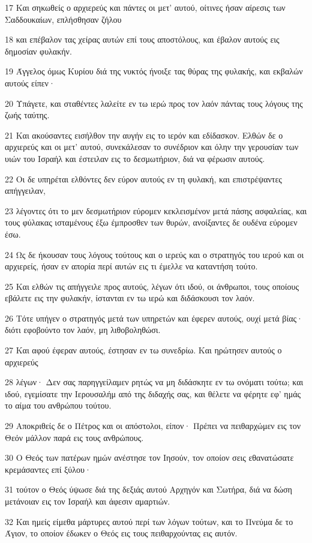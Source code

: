 \par 17 Και σηκωθείς ο αρχιερεύς και πάντες οι μετ' αυτού, οίτινες ήσαν αίρεσις των Σαδδουκαίων, επλήσθησαν ζήλου
\par 18 και επέβαλον τας χείρας αυτών επί τους αποστόλους, και έβαλον αυτούς εις δημοσίαν φυλακήν.
\par 19 Άγγελος όμως Κυρίου διά της νυκτός ήνοιξε τας θύρας της φυλακής, και εκβαλών αυτούς είπεν·
\par 20 Υπάγετε, και σταθέντες λαλείτε εν τω ιερώ προς τον λαόν πάντας τους λόγους της ζωής ταύτης.
\par 21 Και ακούσαντες εισήλθον την αυγήν εις το ιερόν και εδίδασκον. Ελθών δε ο αρχιερεύς και οι μετ' αυτού, συνεκάλεσαν το συνέδριον και όλην την γερουσίαν των υιών του Ισραήλ και έστειλαν εις το δεσμωτήριον, διά να φέρωσιν αυτούς.
\par 22 Οι δε υπηρέται ελθόντες δεν εύρον αυτούς εν τη φυλακή, και επιστρέψαντες απήγγειλαν,
\par 23 λέγοντες ότι το μεν δεσμωτήριον εύρομεν κεκλεισμένον μετά πάσης ασφαλείας, και τους φύλακας ισταμένους έξω έμπροσθεν των θυρών, ανοίξαντες δε ουδένα εύρομεν έσω.
\par 24 Ως δε ήκουσαν τους λόγους τούτους και ο ιερεύς και ο στρατηγός του ιερού και οι αρχιερείς, ήσαν εν απορία περί αυτών εις τι έμελλε να καταντήση τούτο.
\par 25 Και ελθών τις απήγγειλε προς αυτούς, λέγων ότι ιδού, οι άνθρωποι, τους οποίους εβάλετε εις την φυλακήν, ίστανται εν τω ιερώ και διδάσκουσι τον λαόν.
\par 26 Τότε υπήγεν ο στρατηγός μετά των υπηρετών και έφερεν αυτούς, ουχί μετά βίας· διότι εφοβούντο τον λαόν, μη λιθοβοληθώσι.
\par 27 Και αφού έφεραν αυτούς, έστησαν εν τω συνεδρίω. Και ηρώτησεν αυτούς ο αρχιερεύς
\par 28 λέγων· Δεν σας παρηγγείλαμεν ρητώς να μη διδάσκητε εν τω ονόματι τούτω; και ιδού, εγεμίσατε την Ιερουσαλήμ από της διδαχής σας, και θέλετε να φέρητε εφ' ημάς το αίμα του ανθρώπου τούτου.
\par 29 Αποκριθείς δε ο Πέτρος και οι απόστολοι, είπον· Πρέπει να πειθαρχώμεν εις τον Θεόν μάλλον παρά εις τους ανθρώπους.
\par 30 Ο Θεός των πατέρων ημών ανέστησε τον Ιησούν, τον οποίον σεις εθανατώσατε κρεμάσαντες επί ξύλου·
\par 31 τούτον ο Θεός ύψωσε διά της δεξιάς αυτού Αρχηγόν και Σωτήρα, διά να δώση μετάνοιαν εις τον Ισραήλ και άφεσιν αμαρτιών.
\par 32 Και ημείς είμεθα μάρτυρες αυτού περί των λόγων τούτων, και το Πνεύμα δε το Άγιον, το οποίον έδωκεν ο Θεός εις τους πειθαρχούντας εις αυτόν.
